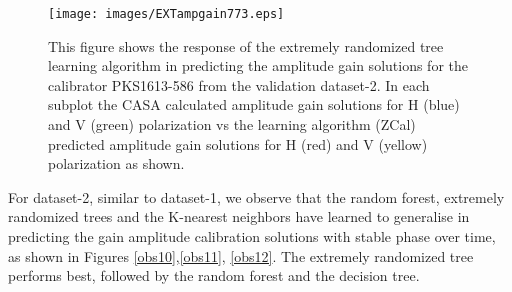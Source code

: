 \begin{figure}[H]
    \texttt{[image: images/EXTampgain773.eps]}
    \caption{This figure shows the response of the extremely randomized tree learning algorithm in predicting the amplitude gain solutions for the calibrator PKS1613-586 from the validation dataset-2. In each subplot the CASA calculated amplitude gain solutions for H (blue) and V (green) polarization vs the learning algorithm (ZCal) predicted amplitude gain solutions for H (red) and V (yellow) polarization as shown.}
     \label{ea3}
\end{figure}


For dataset-2, similar to dataset-1, we observe that the random forest, extremely randomized trees and the K-nearest neighbors have learned to generalise in predicting the gain amplitude calibration solutions with stable phase over time, as shown in Figures \ref{obs10},\ref{obs11}, \ref{obs12}. The extremely randomized tree performs best, followed by the random forest and the decision tree.









